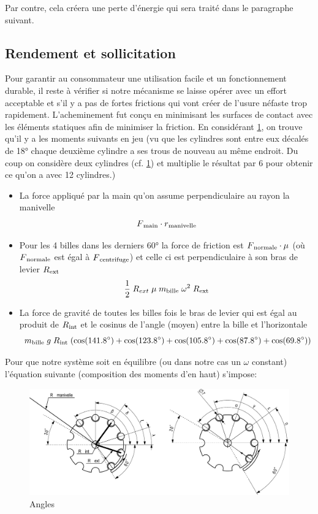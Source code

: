 Par contre, cela créera une perte d'énergie qui sera traité dans le paragraphe suivant.

\subsection{Rendement et sollicitation}
Pour garantir au consommateur une utilisation facile et un fonctionnement durable, il reste à vérifier si notre mécanisme se laisse opérer avec un effort acceptable et s'il y a pas de fortes frictions qui vont créer de l'usure néfaste trop rapidement. L'acheminement fut conçu en minimisant les surfaces de contact avec les éléments statiques afin de minimiser la friction. En considérant \ref{fig:4.3}, on trouve qu'il y a les moments suivants en jeu (vu que les cylindres sont entre eux décalés de \ang{18} chaque deuxième cylindre a ses trous de nouveau au même endroit. Du coup on considère deux cylindres (cf. \ref{fig:4.3}) et multiplie le résultat par 6 pour obtenir ce qu'on a avec \num{12} cylindres.)

\begin{itemize}
    \item La force appliqué par la main qu'on assume perpendiculaire au rayon la manivelle
\[F\textsubscript{main} \cdot r\textsubscript{manivelle}\]

    \item Pour les \num{4} billes dans les derniers \ang{60} la force de friction est \(F\textsubscript{normale}\cdot \mu\) (où $F\textsubscript{normale}$ est égal à $F\textsubscript{centrifuge} $) et celle ci est perpendiculaire à son bras de levier $R\textsubscript{ext}$
\[\frac{1}{2} \; R_{ext} \; \mu \; m\textsubscript{bille} \; \omega^{2} \; R\textsubscript{ext}\]

    \item La force de gravité de toutes les billes fois le bras de levier qui est égal au produit de $R\textsubscript{int}$ et le cosinus de l'angle (moyen) entre la bille et l'horizontale
\[m\textsubscript{bille} \; g\; R\textsubscript{int} \; (\cos(\ang{141.8}) + \cos(\ang{123.8}) + \cos(\ang{105.8}) + \cos(\ang{87.8}) + \cos(\ang{69.8}))\]

\end{itemize}

Pour que notre système soit en équilibre (ou dans notre cas un $\omega$ constant) l'équation suivante (composition des moments d'en haut) s'impose:

\begin{figure}
    \centering
    \includegraphics[width=\textwidth]{Graphics/Dessins_justification_Leon/JUST_COS_FAUSSE_COTES.pdf}
    \caption{Angles}
    \label{fig:4.3}
\end{figure}

